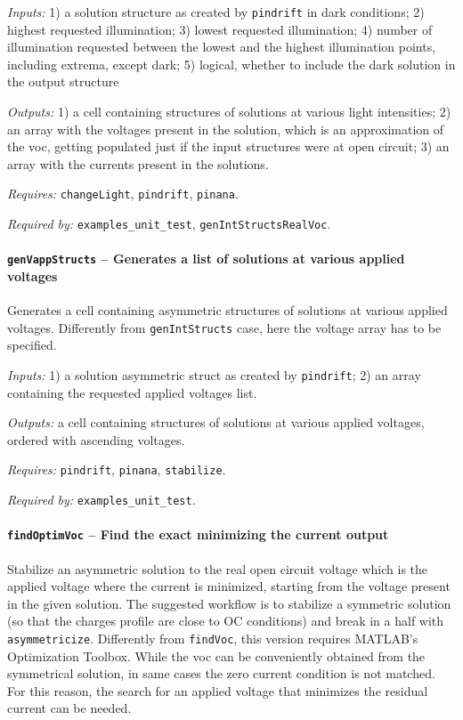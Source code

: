 		\textit{Inputs:} 1) a solution structure as created by \texttt{pin\-drift} in dark conditions; 
		2) highest requested illumination;
		3) lowest requested illumination;
		4) number of illumination requested between the lowest and the highest illumination points, including extrema, except dark;
		5) logical, whether to include the dark solution in the output structure
		
\textit{Outputs:} 1) a cell containing structures of solutions at various light
     intensities;
2) an array with the voltages present in the solution, which is
     an approximation of the \gls{voc}, getting populated just if the input
     structures were at open circuit;
 3) an array with the currents present in the solutions.
 
\textit{Requires:} \texttt{change\-Light}, \texttt{pin\-drift}, \texttt{pinana}.

\textit{Required by:} \texttt{examples\_unit\_test}, \texttt{gen\-Int\-Structs\-Real\-Voc}.

		\paragraph{\texttt{gen\-Vapp\-Structs} -- Generates a list of solutions at various applied voltages}\label{genVappStructs}
Generates a cell containing asymmetric structures of solutions at various applied voltages.
Differently from \texttt{gen\-Int\-Structs} case, here the voltage array has to be specified.

\textit{Inputs:} 1) a solution asymmetric struct as created by \texttt{pin\-drift};
2) an array containing the requested applied voltages list.

\textit{Outputs:} a cell containing structures of solutions at various applied
     voltages, ordered with ascending voltages.
     
\textit{Requires:} \texttt{pin\-drift}, \texttt{pinana}, \texttt{stabilize}.

\textit{Required by:} \texttt{examples\_unit\_test}.

		\paragraph{\texttt{find\-Optim\-Voc} -- Find the exact  minimizing the current output}
Stabilize an asymmetric solution to the real open circuit voltage
which is the applied voltage where the current is minimized,
starting from the voltage present in the given solution. The suggested
workflow is to stabilize a symmetric solution (so that the charges
profile are close to OC conditions) and break in a half with
\texttt{asymmetricize}.
Differently from \texttt{find\-Voc}, this version requires MATLAB's Optimization Toolbox.
While the \gls{voc} can be conveniently obtained from the symmetrical solution, in same cases the zero current condition is not matched.
For this reason, the search for an applied voltage that minimizes the residual current can be needed.
		
